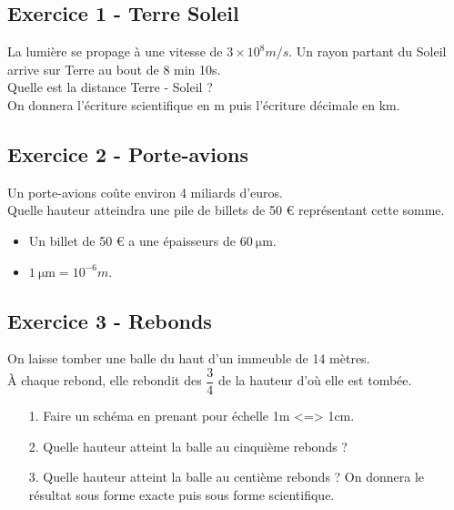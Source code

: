 \documentclass[10pt]{article}
\begin{document}
\subsection*{Exercice 1 - Terre Soleil} 

La lumière se propage à une vitesse de $3 \times 10^8 m/s$. Un rayon partant du Soleil arrive sur Terre au bout de 8 min 10s. \\
Quelle est la distance Terre - Soleil ? \\
On donnera l'écriture scientifique en m puis l'écriture décimale en km.


\subsection*{Exercice 2 - Porte-avions} 

Un porte-avions coûte environ 4 miliards d'euros. \\
Quelle hauteur atteindra une pile de billets de 50 \euro \: représentant cette somme.

\begin{itemize}
\item Un billet de 50 \euro \: a une épaisseurs de $\SI{60}{\micro\meter}$. 
\item $\SI{1}{\micro \meter} = 10^{-6}m$.
\end{itemize}

\subsection*{Exercice 3 - Rebonds}

On laisse tomber une balle du haut d'un immeuble de 14 mètres.\\
À chaque rebond, elle rebondit des $\dfrac{3}{4}$ de la hauteur d'où elle est tombée.\\
\begin{enumerate}
\item[1.] Faire un schéma en prenant pour échelle 1m <=> 1cm.

\item[2.] Quelle hauteur atteint la balle au cinquième rebonds ?

\item[3.] Quelle hauteur atteint la balle au centième rebonds ? On donnera le résultat sous forme exacte puis sous forme scientifique.
\end{enumerate}
\end{document}
